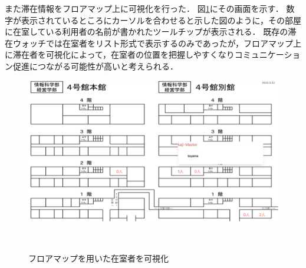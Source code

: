 また滞在情報をフロアマップ上に可視化を行った．
図\ref{fig:floor}にその画面を示す．
数字が表示されているところにカーソルを合わせると示した図のように，その部屋に在室している利用者の名前が書かれたツールチップが表示される．
既存の滞在ウォッチでは在室者をリスト形式で表示するのみであったが，フロアマップ上に滞在者を可視化によって，在室者の位置を把握しやすくなりコミュニケーション促進につながる可能性が高いと考えられる．


\begin{figure}[tbh]
  \centering
  \includegraphics[width=13cm]{image/floorMap.jpg}
  \caption{フロアマップを用いた在室者を可視化}　\label{fig:floor}
\end{figure}




















